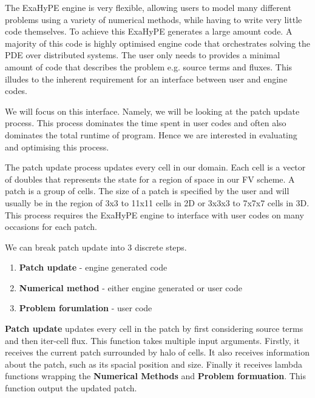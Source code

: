 


The ExaHyPE engine is very flexible, allowing users to model many different problems using a variety of numerical methods, while having to write very little code themselves.
To achieve this ExaHyPE generates a large amount code.
A majority of this code is highly optimised engine code that orchestrates solving the PDE over distributed systems.
The user only needs to provides a minimal amount of code that describes the problem e.g. source terms and fluxes.
This illudes to the inherent requirement for an interface between user and engine codes.

We will focus on this interface.
Namely, we will be looking at the patch update process.
This process dominates the time spent in user codes and often also dominates the total runtime of program.
Hence we are interested in evaluating and optimising this process.

The patch update process updates every cell in our domain.
Each cell is a vector of doubles that represents the state for a region of space in our FV scheme. 
A patch is a group of cells.
The size of a patch is specified by the user and will usually be in the region of 3x3 to 11x11 cells in 2D or 3x3x3 to 7x7x7 cells in 3D. %
This process requires the ExaHyPE engine to interface with user codes on many occasions for each patch.
 
\newcommand{\func}[1]{\textbf{#1}}
\newcommand{\var}[1]{\textbf{#1}}

We can break patch update into 3 discrete steps.
\begin{enumerate}
    \item \func{Patch update} - engine generated code
    \item  \func{Numerical method} - either engine generated or user code
    \item \func{Problem forumlation} - user code
\end{enumerate}

\func{Patch update} updates every cell in the patch by first considering source terms and then iter-cell flux.
This function takes multiple input arguments.
Firstly, it receives the current patch surrounded by halo of cells.
It also receives information about the patch, such as its spacial position and size.
Finally it receives lambda functions wrapping the \func{Numerical Methods} and \func{Problem formuation}. 
This function output the updated patch.  

